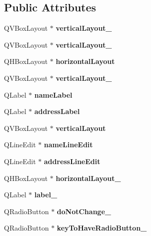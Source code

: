 \subsection*{Public Attributes}
\begin{DoxyCompactItemize}
\item 
\mbox{\label{class_ui___edit_customer_a0959bddff05c5ea82ac2c1eee15e21e1}} 
Q\+V\+Box\+Layout $\ast$ {\bfseries vertical\+Layout\+\_}
\item 
\mbox{\label{class_ui___edit_customer_a926572539b1140be72f2977aaf13bf78}} 
Q\+V\+Box\+Layout $\ast$ {\bfseries vertical\+Layout\+\_}
\item 
\mbox{\label{class_ui___edit_customer_aab7b80c6236623554f1a5aa86019bb7d}} 
Q\+H\+Box\+Layout $\ast$ {\bfseries horizontal\+Layout}
\item 
\mbox{\label{class_ui___edit_customer_aa67a39a4d1f0efb5fd233aa1658302c5}} 
Q\+V\+Box\+Layout $\ast$ {\bfseries vertical\+Layout\+\_}
\item 
\mbox{\label{class_ui___edit_customer_ab374c62aae338f473f9f439a74f02143}} 
Q\+Label $\ast$ {\bfseries name\+Label}
\item 
\mbox{\label{class_ui___edit_customer_a5bcb54ce3f0f4a67a3c201a51ef616ab}} 
Q\+Label $\ast$ {\bfseries address\+Label}
\item 
\mbox{\label{class_ui___edit_customer_a4c5fddaa6642af69063f213bd1fa9369}} 
Q\+V\+Box\+Layout $\ast$ {\bfseries vertical\+Layout}
\item 
\mbox{\label{class_ui___edit_customer_af1275f74c351b1b5283ef368e9ff92c0}} 
Q\+Line\+Edit $\ast$ {\bfseries name\+Line\+Edit}
\item 
\mbox{\label{class_ui___edit_customer_a19c21fec798a0645e161c370ca89cd2e}} 
Q\+Line\+Edit $\ast$ {\bfseries address\+Line\+Edit}
\item 
\mbox{\label{class_ui___edit_customer_a646f852a601f852fd4bd6d4a79cc9eaa}} 
Q\+H\+Box\+Layout $\ast$ {\bfseries horizontal\+Layout\+\_}
\item 
\mbox{\label{class_ui___edit_customer_a6ab00c6df1b6086551f7f58986f4013f}} 
Q\+Label $\ast$ {\bfseries label\+\_}
\item 
\mbox{\label{class_ui___edit_customer_ae145c6789a4753a3e2181a5e3ca785fd}} 
Q\+Radio\+Button $\ast$ {\bfseries do\+Not\+Change\+\_}
\item 
\mbox{\label{class_ui___edit_customer_a072a95e1db90bae083db64c46feead2e}} 
Q\+Radio\+Button $\ast$ {\bfseries key\+To\+Have\+Radio\+Button\+\_}
\item 

\end{DoxyCompactItemize}
